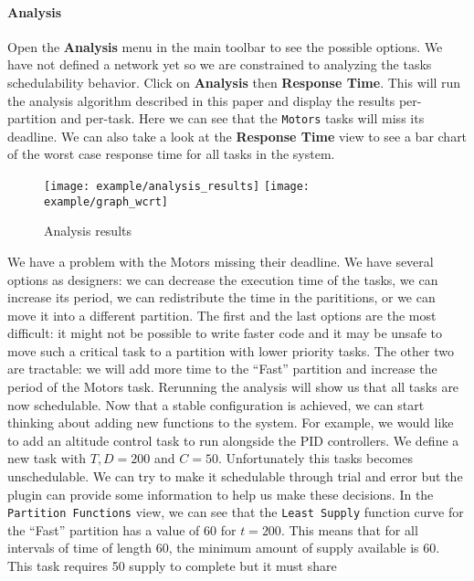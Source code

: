 \paragraph{Analysis}
Open the \textbf{Analysis} menu in the main
toolbar to see the possible options.
We have not defined a network yet so we are constrained to analyzing
the tasks schedulability behavior.
Click on \textbf{Analysis} then \textbf{Response Time}.
This will run the analysis algorithm described in this paper
and display the results per-partition and per-task.
Here we can see that the \texttt{Motors} tasks will miss its deadline.
We can also take a look at the \textbf{Response Time} view to see
a bar chart of the worst case response time for all tasks in the system.
\begin{figure}[H]
    \centering
    \texttt{[image: example/analysis\_results]}
    \texttt{[image: example/graph\_wcrt]}
    \caption{Analysis results}
\end{figure}
We have a problem with the Motors missing their deadline. We have several
options as designers: we can decrease the execution time of the tasks,
we can increase its period, we can redistribute the time in the parititions,
or we can move it into a different partition.
The first and the last options are the most difficult: it might not be
possible to write faster code and it may be unsafe to move such a critical
task to a partition with lower priority tasks. The other two are tractable:
we will add more time to the ``Fast'' partition and increase the period
of the Motors task. Rerunning the analysis will show us that all tasks
are now schedulable.
Now that a stable configuration is achieved, we can start thinking about 
adding new functions to the system. For example, we would like to add an
altitude control task to run alongside the PID controllers.
We define a new task with $T,D = 200$ and $C = 50$. Unfortunately this
tasks becomes unschedulable.
We can try to make it schedulable through trial and error but the plugin
can provide some information to help us make these decisions.
In the \texttt{Partition Functions} view, we can see that the \texttt{Least Supply}
function curve for the ``Fast'' partition has a value of 60 for $t = 200$. This
means that for all intervals of time of length 60, the minimum amount of supply
available is 60. This task requires 50 supply to complete but it must share
